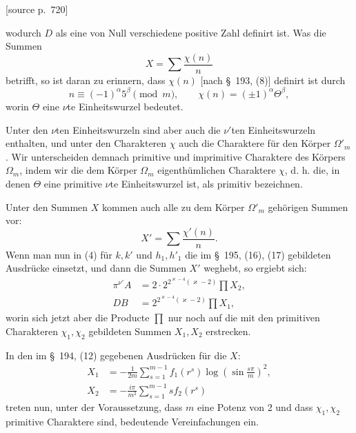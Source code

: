 \documentclass[11pt]{article}
\newcommand{\srcpage}[1]{\par\medskip\noindent\textsf{[source p.~#1]}\par\smallskip}
\begin{document}
\srcpage{720}
wodurch $D$ als eine von Null verschiedene positive Zahl definirt ist. Was die Summen
\[
X=\sum\frac{\chi(n)}{n}
\]
betrifft, so ist daran zu erinnern, dass $\chi(n)$ [nach \S~193, (8)] definirt ist durch
\begin{equation}
n\equiv(-1)^\alpha5^\beta\pmod m,
\qquad
\chi(n)=(\pm1)^\alpha\Theta^\beta,
\tag{7}
\end{equation}
worin $\Theta$ eine $\nu$te Einheitswurzel bedeutet.

Unter den $\nu$ten Einheitswurzeln sind aber auch die $\nu'$ten Einheitswurzeln enthalten, und unter den Charakteren $\chi$ auch die Charaktere für den Körper $\Omega'_m$. Wir unterscheiden demnach primitive und imprimitive Charaktere des Körpers $\Omega_m$, indem wir die dem Körper $\Omega_m$ eigenthümlichen Charaktere $\chi$, d. h. die, in denen $\Theta$ eine primitive $\nu$te Einheitswurzel ist, als primitiv bezeichnen.

Unter den Summen $X$ kommen auch alle zu dem Körper $\Omega'_m$ gehörigen Summen vor:
\[
X'=\sum\frac{\chi'(n)}{n}.
\]
Wenn man nun in (4) für $k,k'$ und $h_1,h'_1$ die im \S~195, (16), (17) gebildeten Ausdrücke einsetzt, und dann die Summen $X'$ weghebt, so ergiebt sich:
\begin{equation}
\begin{aligned}
\pi^{\nu'}A&=2\cdot2^{2^{\varkappa-4}(\varkappa-2)}\prod X_2,\\
DB&=2^{2^{\varkappa-4}(\varkappa-2)}\prod X_1,
\end{aligned}
\tag{8}
\end{equation}
worin sich jetzt aber die Producte $\prod$ nur noch auf die mit den primitiven Charakteren $\chi_1,\chi_2$ gebildeten Summen $X_1,X_2$ erstrecken.

In den im \S~194, (12) gegebenen Ausdrücken für die $X$:
\begin{equation}
\begin{aligned}
X_1&=-\frac1{2m}\sum_{s=1}^{m-1} f_1(r^s)\log\left(\sin\frac{s\pi}{m}\right)^2,\\
X_2&=-\frac{i\pi}{m^2}\sum_{s=1}^{m-1}s f_2(r^s)
\end{aligned}
\tag{9}
\end{equation}
treten nun, unter der Voraussetzung, dass $m$ eine Potenz von 2 und dass $\chi_1,\chi_2$ primitive Charaktere sind, bedeutende Vereinfachungen ein.
\end{document}
